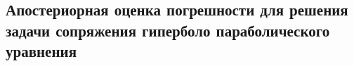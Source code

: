 \subsection{Апостериорная оценка погрешности для решения задачи сопряжения гиперболо параболического уравнения}
